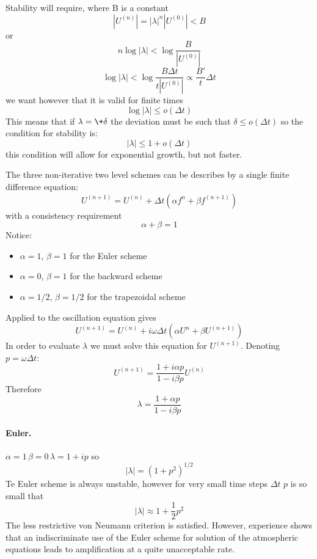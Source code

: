 Stability will require, where B is a constant
\begin{equation}
    |U^{(n)}|=|\lambda|^n|U^{(0)}|<B
\end{equation}
or 
\begin{equation}
    n\log|\lambda|<\log\frac{B}{|U^{(0)}|}
\end{equation}
$$\log|\lambda|<\log\frac{B\Delta t}{t|U^{(0)}|}\propto \frac{B'}{t}\Delta t$$
we want however that it is valid for finite times
$$\log|\lambda|\leq o(\Delta t)$$
This means that if $\lambda=\+\delta$ the deviation must be such that $\delta\leq o(\Delta t)$ so the condition for stability is:
\begin{equation}
    |\lambda|\leq 1+o(\Delta t)
\end{equation}
this condition will allow for exponential growth, but not faster.

The three non-iterative two level schemes can be describes by a single finite difference equation:
\begin{equation}\label{3.2.6}
    U^{(n+1)}=U^{(n)}+\Delta t\left(\alpha f^n+\beta f^{(n+1)}\right)
\end{equation}
with a consistency requirement
$$\alpha+\beta=1$$
Notice: 
\begin{itemize}
    \item $\alpha=1$, $\beta =1$ for the Euler scheme
    \item $\alpha=0$, $\beta=1$ for the backward scheme
    \item $\alpha=1/2$, $\beta=1/2$ for the trapezoidal scheme
\end{itemize}
Applied to the oscillation equation gives
\begin{equation}
    U^{(n+1)}=U^{(n)}+i\omega\Delta t\left(\alpha U^n+\beta U^{(n+1)}\right)
\end{equation}
In order to evaluate $\lambda$ we must solve this equation for $U^{(n+1)}$. Denoting $p=\omega\Delta t$:
\begin{equation}\label{3.2.9}
    U^{(n+1)}=\frac{1+i\alpha p}{1-i\beta p}U^{(n)}
\end{equation}
Therefore 
\begin{equation}\label{3.2.10}
    \lambda=\frac{1+\alpha p}{1-i\beta p}
\end{equation}
\paragraph{Euler.} $\alpha=1 \, \beta=0 \, \lambda=1+ip$
so $$|\lambda|=(1+p^2)^{1/2}$$
Te Euler scheme is always unstable, however for very small time steps $\Delta t$ $p$ is so small that
$$|\lambda|\approx 1+\frac{1}{2}p^2$$
The less restrictive von Neumann criterion is satisfied. However, experience shows that an indiscriminate use of the Euler scheme for solution of the atmospheric equations leads to amplification at a quite unacceptable rate.
